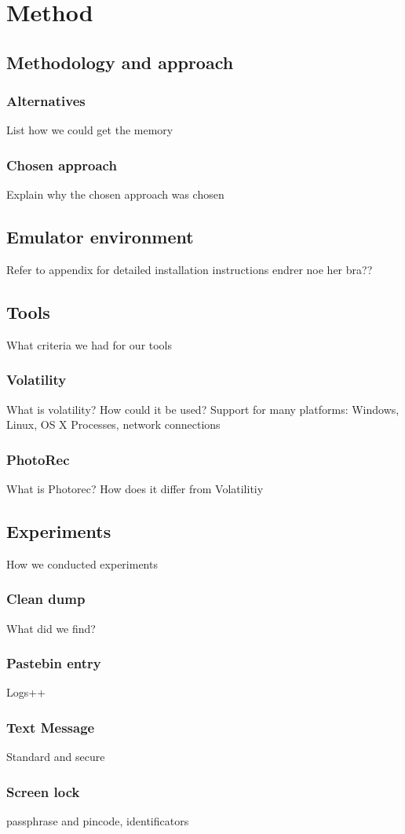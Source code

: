 \section{Method}
\subsection{Methodology and approach}
\subsubsection{Alternatives}
List how we could get the memory
\subsubsection{Chosen approach}
Explain why the chosen approach was chosen
\subsection{Emulator environment}
Refer to appendix for detailed installation instructions
endrer noe her bra??
\subsection{Tools}
What criteria we had for our tools
\subsubsection{Volatility}
What is volatility? How could it be used?
Support for many platforms: Windows, Linux, OS X
Processes, network connections
\subsubsection{PhotoRec}
What is Photorec? How does it differ from Volatilitiy
\subsection{Experiments}
How we conducted experiments
\subsubsection{Clean dump}
What did we find?
\subsubsection{Pastebin entry}
Logs++
\subsubsection{Text Message}
Standard and secure
\subsubsection{Screen lock}
passphrase and pincode, identificators
